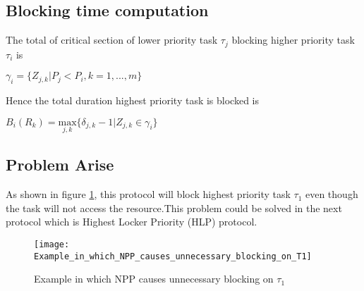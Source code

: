 \subsection{Blocking time computation}

	The total of critical section of lower priority task $\tau_{j}$ blocking higher priority task $\tau_{i}$ is

\begin{center}
$ \gamma_{i}=\{Z_{j,k} | P_{j}<P_{i}, k=1,...,m \} $
\end{center}

Hence the total duration highest priority task is blocked is

\begin{center}

$B_{i}(R_{k})=\underset{j,k}{\mathrm{max}} \{ \delta_{j,k}-1 | Z_{j,k} \in \gamma_{i}\}  $
\end{center}

\subsection{Problem Arise}

As shown in figure \ref{fig:Example_in_which_NPP_causes_unnecessary_blocking_on_T1}, this protocol will block highest priority task $ \tau_{1} $ even though the task will not access the resource.This problem could be solved in the next protocol which is Highest Locker Priority (HLP) protocol.

\begin{figure}[h]
    \centering
    \texttt{[image: Example\_in\_which\_NPP\_causes\_unnecessary\_blocking\_on\_T1]}
    \caption{Example in which NPP causes unnecessary blocking on $ \tau_{1} $ \cite{b5}}
    \label{fig:Example_in_which_NPP_causes_unnecessary_blocking_on_T1}
\end{figure}



 
